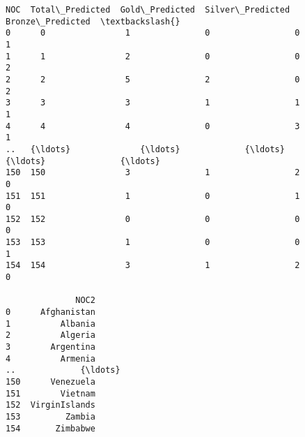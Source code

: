 \documentclass[11pt]{article}
\begin{document}
    \begin{Verbatim}[commandchars=\\\{\}]
     NOC  Total\_Predicted  Gold\_Predicted  Silver\_Predicted  Bronze\_Predicted  \textbackslash{}
0      0                1               0                 0                 1
1      1                2               0                 0                 2
2      2                5               2                 0                 2
3      3                3               1                 1                 1
4      4                4               0                 3                 1
..   {\ldots}              {\ldots}             {\ldots}               {\ldots}               {\ldots}
150  150                3               1                 2                 0
151  151                1               0                 1                 0
152  152                0               0                 0                 0
153  153                1               0                 0                 1
154  154                3               1                 2                 0

              NOC2
0      Afghanistan
1          Albania
2          Algeria
3        Argentina
4          Armenia
..             {\ldots}
150      Venezuela
151        Vietnam
152  VirginIslands
153         Zambia
154       Zimbabwe


\end{Verbatim}
\end{document}
